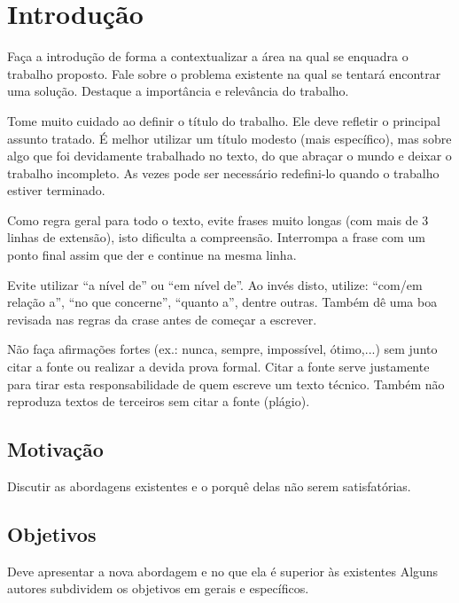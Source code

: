 \documentclass[openright]{ifrs} %
\begin{document}
\listoffigures

\listoftables


\tableofcontents

\chapter{Introdução}
Faça a introdução de forma a contextualizar a área na qual se enquadra o trabalho proposto. Fale sobre o problema existente na qual se tentará encontrar uma solução. Destaque a importância e relevância do trabalho.

Tome muito cuidado ao definir o título do trabalho. Ele deve refletir o principal assunto tratado. É melhor utilizar um título modesto (mais específico), mas sobre algo que foi devidamente trabalhado no texto, do que abraçar o mundo e deixar o trabalho incompleto. As vezes pode ser necessário redefini-lo quando o trabalho estiver terminado.

Como regra geral para todo o texto, evite frases muito longas (com mais de 3 linhas de extensão), isto dificulta a compreensão. Interrompa a frase com um ponto final assim que der e continue na mesma linha.

Evite utilizar ``a nível de'' ou ``em nível de''. Ao invés disto, utilize: ``com/em relação a'', ``no que concerne'', ``quanto a'', dentre outras. Também dê uma boa revisada nas regras da crase antes de começar a escrever.

Não faça afirmações fortes (ex.: nunca, sempre, impossível, ótimo,...) sem junto citar a fonte ou realizar a devida prova formal. Citar a fonte serve justamente para tirar esta responsabilidade de quem escreve um texto técnico. Também não reproduza textos de terceiros sem citar a fonte (plágio).
\section{Motivação}
Discutir as abordagens existentes e o porquê delas não serem satisfatórias.
\section{Objetivos}
Deve apresentar a nova abordagem e no que ela é superior às existentes
Alguns autores subdividem os objetivos em gerais e específicos.
\end{document}
